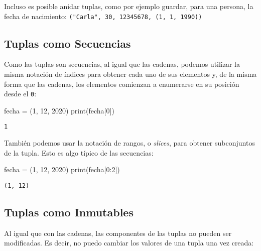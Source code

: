 \documentclass[
  letterpaper,
  DIV=11,
  numbers=noendperiod]{scrreprt}
\newenvironment{Shaded}{\begin{snugshade}}{\end{snugshade}}
\newcommand{\BuiltInTok}[1]{\textcolor[rgb]{0.00,0.23,0.31}{#1}}
\newcommand{\DecValTok}[1]{\textcolor[rgb]{0.68,0.00,0.00}{#1}}
\newcommand{\NormalTok}[1]{\textcolor[rgb]{0.00,0.23,0.31}{#1}}
\newcommand{\OperatorTok}[1]{\textcolor[rgb]{0.37,0.37,0.37}{#1}}
\begin{document}
Incluso es posible anidar tuplas, como por ejemplo guardar, para una
persona, la fecha de nacimiento:
\texttt{("Carla",\ 30,\ 12345678,\ (1,\ 1,\ 1990))}

\subsection{Tuplas como Secuencias}\label{tuplas-como-secuencias}

Como las tuplas son secuencias, al igual que las cadenas, podemos
utilizar la misma notación de índices para obtener cada uno de sus
elementos y, de la misma forma que las cadenas, los elementos comienzan
a enumerarse en su posición desde el \texttt{0}:

\begin{Shaded}
\begin{Highlighting}[]
\NormalTok{fecha }\OperatorTok{=}\NormalTok{ (}\DecValTok{1}\NormalTok{, }\DecValTok{12}\NormalTok{, }\DecValTok{2020}\NormalTok{)}
\BuiltInTok{print}\NormalTok{(fecha[}\DecValTok{0}\NormalTok{])}
\end{Highlighting}
\end{Shaded}

\begin{verbatim}
1
\end{verbatim}

También podemos usar la notación de rangos, o \emph{slices}, para
obtener subconjuntos de la tupla. Esto es algo típico de las secuencias:

\begin{Shaded}
\begin{Highlighting}[]
\NormalTok{fecha }\OperatorTok{=}\NormalTok{ (}\DecValTok{1}\NormalTok{, }\DecValTok{12}\NormalTok{, }\DecValTok{2020}\NormalTok{)}
\BuiltInTok{print}\NormalTok{(fecha[}\DecValTok{0}\NormalTok{:}\DecValTok{2}\NormalTok{])}
\end{Highlighting}
\end{Shaded}

\begin{verbatim}
(1, 12)
\end{verbatim}

\subsection{Tuplas como Inmutables}\label{tuplas-como-inmutables}

Al igual que con las cadenas, las componentes de las tuplas no pueden
ser modificadas. Es decir, no puedo cambiar los valores de una tupla una
vez creada:
\end{document}

